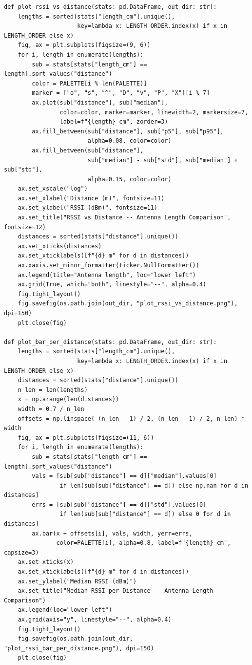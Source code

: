 \begin{lstlisting}[style=appendix-py, caption={Multi-file RSSI plotting (antenna comparison)}, label={lst:rssi-plot}]
def plot_rssi_vs_distance(stats: pd.DataFrame, out_dir: str):
    lengths = sorted(stats["length_cm"].unique(),
                     key=lambda x: LENGTH_ORDER.index(x) if x in LENGTH_ORDER else x)
    fig, ax = plt.subplots(figsize=(9, 6))
    for i, length in enumerate(lengths):
        sub = stats[stats["length_cm"] == length].sort_values("distance")
        color = PALETTE[i % len(PALETTE)]
        marker = ["o", "s", "^", "D", "v", "P", "X"][i % 7]
        ax.plot(sub["distance"], sub["median"],
                color=color, marker=marker, linewidth=2, markersize=7,
                label=f"{length} cm", zorder=3)
        ax.fill_between(sub["distance"], sub["p5"], sub["p95"],
                        alpha=0.08, color=color)
        ax.fill_between(sub["distance"],
                        sub["median"] - sub["std"], sub["median"] + sub["std"],
                        alpha=0.15, color=color)
    ax.set_xscale("log")
    ax.set_xlabel("Distance (m)", fontsize=11)
    ax.set_ylabel("RSSI (dBm)", fontsize=11)
    ax.set_title("RSSI vs Distance -- Antenna Length Comparison", fontsize=12)
    distances = sorted(stats["distance"].unique())
    ax.set_xticks(distances)
    ax.set_xticklabels([f"{d} m" for d in distances])
    ax.xaxis.set_minor_formatter(ticker.NullFormatter())
    ax.legend(title="Antenna length", loc="lower left")
    ax.grid(True, which="both", linestyle="--", alpha=0.4)
    fig.tight_layout()
    fig.savefig(os.path.join(out_dir, "plot_rssi_vs_distance.png"), dpi=150)
    plt.close(fig)

def plot_bar_per_distance(stats: pd.DataFrame, out_dir: str):
    lengths = sorted(stats["length_cm"].unique(),
                     key=lambda x: LENGTH_ORDER.index(x) if x in LENGTH_ORDER else x)
    distances = sorted(stats["distance"].unique())
    n_len = len(lengths)
    x = np.arange(len(distances))
    width = 0.7 / n_len
    offsets = np.linspace(-(n_len - 1) / 2, (n_len - 1) / 2, n_len) * width
    fig, ax = plt.subplots(figsize=(11, 6))
    for i, length in enumerate(lengths):
        sub = stats[stats["length_cm"] == length].sort_values("distance")
        vals = [sub[sub["distance"] == d]["median"].values[0]
                if len(sub[sub["distance"] == d]) else np.nan for d in distances]
        errs = [sub[sub["distance"] == d]["std"].values[0]
                if len(sub[sub["distance"] == d]) else 0 for d in distances]
        ax.bar(x + offsets[i], vals, width, yerr=errs,
               color=PALETTE[i], alpha=0.8, label=f"{length} cm", capsize=3)
    ax.set_xticks(x)
    ax.set_xticklabels([f"{d} m" for d in distances])
    ax.set_ylabel("Median RSSI (dBm)")
    ax.set_title("Median RSSI per Distance -- Antenna Length Comparison")
    ax.legend(loc="lower left")
    ax.grid(axis="y", linestyle="--", alpha=0.4)
    fig.tight_layout()
    fig.savefig(os.path.join(out_dir, "plot_rssi_bar_per_distance.png"), dpi=150)
    plt.close(fig)


\end{lstlisting}
